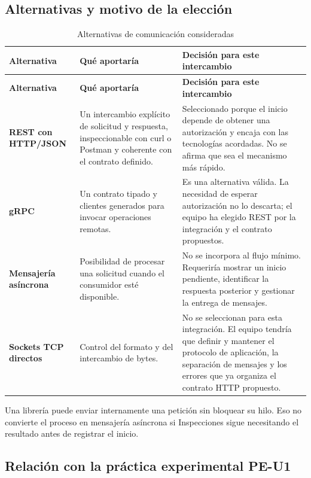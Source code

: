 \documentclass[11pt,a4paper]{article}
\begin{document}
\subsection{Alternativas y motivo de la elección}

\begin{xltabular}{\textwidth}{L{3.2cm}XX}
  \caption{Alternativas de comunicación consideradas}\label{tab:alternativas-com}\\
  \toprule
  \textbf{Alternativa} & \textbf{Qué aportaría} & \textbf{Decisión para este intercambio} \\
  \midrule
  \endfirsthead
  \toprule
  \textbf{Alternativa} & \textbf{Qué aportaría} & \textbf{Decisión para este intercambio} \\
  \midrule
  \endhead
  \bottomrule
  \endfoot
  \textbf{REST con HTTP/JSON} & Un intercambio explícito de solicitud y respuesta, inspeccionable con curl o Postman y coherente con el contrato definido. & Seleccionado porque el inicio depende de obtener una autorización y encaja con las tecnologías acordadas. No se afirma que sea el mecanismo más rápido. \\
  \textbf{gRPC} & Un contrato tipado y clientes generados para invocar operaciones remotas. & Es una alternativa válida. La necesidad de esperar autorización no lo descarta; el equipo ha elegido REST por la integración y el contrato propuestos. \\
  \textbf{Mensajería asíncrona} & Posibilidad de procesar una solicitud cuando el consumidor esté disponible. & No se incorpora al flujo mínimo. Requeriría mostrar un inicio pendiente, identificar la respuesta posterior y gestionar la entrega de mensajes. \\
  \textbf{Sockets TCP directos} & Control del formato y del intercambio de bytes. & No se seleccionan para esta integración. El equipo tendría que definir y mantener el protocolo de aplicación, la separación de mensajes y los errores que ya organiza el contrato HTTP propuesto. \\
\end{xltabular}

Una librería puede enviar internamente una petición sin bloquear su hilo. Eso no convierte el proceso en mensajería asíncrona si Inspecciones sigue necesitando el resultado antes de registrar el inicio.

\subsection{Relación con la práctica experimental PE-U1}
\end{document}
